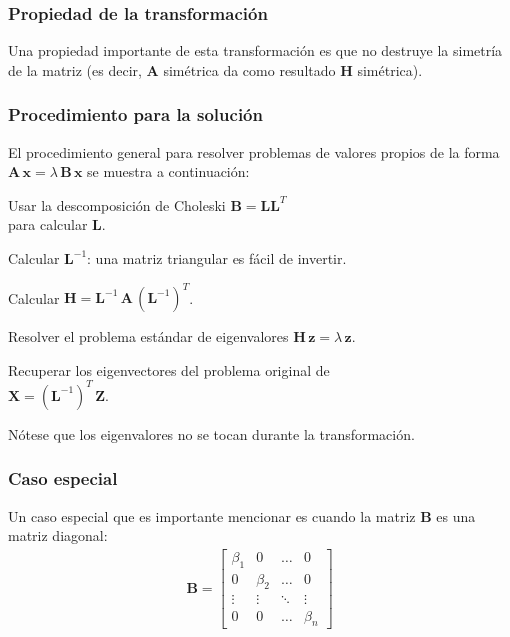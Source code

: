 \documentclass[12pt]{beamer}
\begin{document}
\begin{frame}
\frametitle{Propiedad de la transformación}
Una propiedad importante de esta transformación es que no destruye la simetría de la matriz (es decir, $\mathbf{A}$ simétrica da como resultado $\mathbf{H}$ simétrica).
\end{frame}
\begin{frame}
\frametitle{Procedimiento para la solución}
El procedimiento general para resolver problemas de valores propios de la forma $\mathbf{A \, x} = \lambda \, \mathbf{B \, x}$ se muestra a continuación:
\end{frame}
\begin{frame}
\begin{tcolorbox}[colback=electriccyan!20!white, title=Procedimiento de solución]
Usar la descomposición de Choleski $\mathbf{B} = \mathbf{L L}^{T}$ \\ para calcular $\mathbf{L}$.
\pause

Calcular $\mathbf{L}^{-1}$: una matriz triangular es fácil de invertir.
\pause

Calcular $\mathbf{H} = \mathbf{L}^{-1} \, \mathbf{A} \, (\mathbf{L}^{-1})^{T}$.
\pause

Resolver el problema estándar de eigenvalores $\mathbf{H \, z} = \lambda \, \mathbf{z}$.
\pause 

Recuperar los eigenvectores del problema original de \\ $\mathbf{X} = (\mathbf{L}^{-1})^{T} \, \mathbf{Z}$.
\end{tcolorbox}
\pause
Nótese que los eigenvalores no se tocan durante la transformación.
\end{frame}
\begin{frame}
\frametitle{Caso especial}
Un caso especial que es importante mencionar es cuando la matriz $\mathbf{B}$ es una matriz diagonal:
\pause
\begin{align}
\mathbf{B} =
\begin{bmatrix}
\beta_{1} & 0 & \ldots & 0 \\
0 & \beta_{2} & \ldots & 0 \\
\vdots & \vdots & \ddots & \vdots \\
0 & 0 & \ldots & \beta_{n}
\end{bmatrix}
\label{eq:ecuacion_09_25}
\end{align}
\end{frame}
\end{document}
